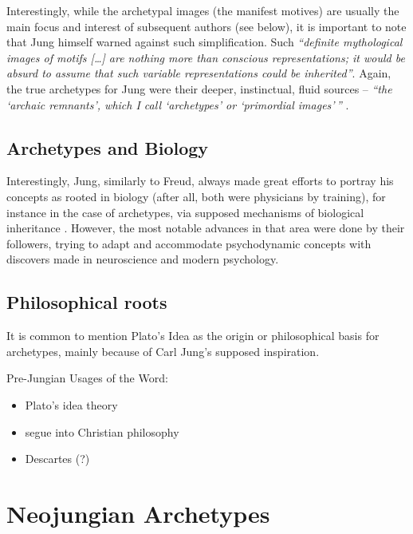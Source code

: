 \documentclass[
]{book}
\providecommand{\tightlist}{%
  \setlength{\itemsep}{0pt}\setlength{\parskip}{0pt}}
\begin{document}
Interestingly, while the archetypal images (the manifest motives) are usually the main focus and interest of subsequent authors (see below), it is important to note that Jung himself warned against such simplification. Such \emph{``definite mythological images of motifs {[}\ldots{]} are nothing more than conscious representations; it would be absurd to assume that such variable representations could be inherited''}. Again, the true archetypes for Jung were their deeper, instinctual, fluid sources -- \emph{``the `archaic remnants', which I call `archetypes' or `primordial images'\,''} \citep{jung1964approaching}.

\hypertarget{archetypes-and-biology}{%
\subsection{Archetypes and Biology}\label{archetypes-and-biology}}

Interestingly, Jung, similarly to Freud, always made great efforts to portray his concepts as rooted in biology (after all, both were physicians by training), for instance in the case of archetypes, via supposed mechanisms of biological inheritance \citep[which is no longer supported by modern genetics modern genetics;][]{roesler2012archetypes}. However, the most notable advances in that area were done by their followers, trying to adapt and accommodate psychodynamic concepts with discovers made in neuroscience and modern psychology.

\hypertarget{philosophical-roots}{%
\subsection{Philosophical roots}\label{philosophical-roots}}

It is common to mention Plato's Idea as the origin or philosophical basis for archetypes, mainly because of Carl Jung's supposed inspiration.

Pre-Jungian Usages of the Word:

\begin{itemize}
\tightlist
\item
  Plato's idea theory
\item
  segue into Christian philosophy
\item
  Descartes (?)
\end{itemize}

\hypertarget{neojungian-archetypes}{%
\section{Neojungian Archetypes}\label{neojungian-archetypes}}
\end{document}
